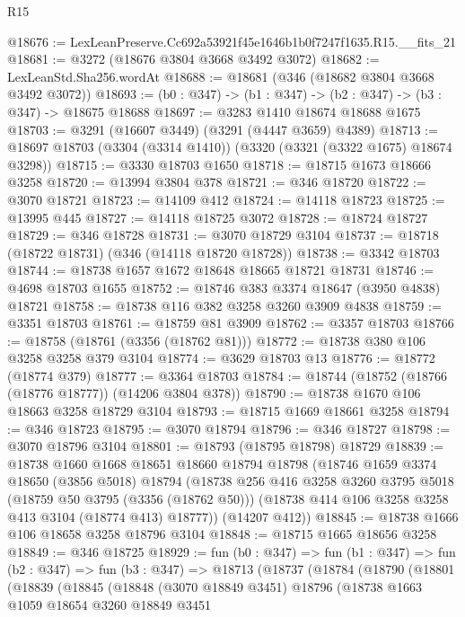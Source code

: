 \begin{lexlean}{R15}
\begin{coremodule}
@18676 := LexLeanPreserve.Cc692a53921f45e1646b1b0f7247f1635.R15.__fits_21
@18681 := @3272 (@18676 @3804 @3668 @3492 @3072)
@18682 := LexLeanStd.Sha256.wordAt
@18688 := @18681 (@346 (@18682 @3804 @3668 @3492 @3072))
@18693 := (b0 : @347) -> (b1 : @347) -> (b2 : @347) -> (b3 : @347) -> @18675 @18688
@18697 := @3283 @1410 @18674 @18688 @1675
@18703 := @3291 (@16607 @3449) (@3291 (@4447 @3659) @4389)
@18713 := @18697 @18703 (@3304 (@3314 @1410)) (@3320 (@3321 (@3322 @1675) @18674 @3298))
@18715 := @3330 @18703 @1650
@18718 := @18715 @1673 @18666 @3258
@18720 := @13994 @3804 @378
@18721 := @346 @18720
@18722 := @3070 @18721
@18723 := @14109 @412
@18724 := @14118 @18723
@18725 := @13995 @445
@18727 := @14118 @18725 @3072
@18728 := @18724 @18727
@18729 := @346 @18728
@18731 := @3070 @18729 @3104
@18737 := @18718 (@18722 @18731) (@346 (@14118 @18720 @18728))
@18738 := @3342 @18703
@18744 := @18738 @1657 @1672 @18648 @18665 @18721 @18731
@18746 := @4698 @18703 @1655
@18752 := @18746 @383 @3374 @18647 (@3950 @4838) @18721
@18758 := @18738 @116 @382 @3258 @3260 @3909 @4838
@18759 := @3351 @18703
@18761 := @18759 @81 @3909
@18762 := @3357 @18703
@18766 := @18758 (@18761 (@3356 (@18762 @81)))
@18772 := @18738 @380 @106 @3258 @3258 @379 @3104
@18774 := @3629 @18703 @13
@18776 := @18772 (@18774 @379)
@18777 := @3364 @18703
@18784 := @18744 (@18752 (@18766 (@18776 @18777)) (@14206 @3804 @378))
@18790 := @18738 @1670 @106 @18663 @3258 @18729 @3104
@18793 := @18715 @1669 @18661 @3258
@18794 := @346 @18723
@18795 := @3070 @18794
@18796 := @346 @18727
@18798 := @3070 @18796 @3104
@18801 := @18793 (@18795 @18798) @18729
@18839 := @18738
    @1660
    @1668
    @18651
    @18660
    @18794
    @18798
    (@18746
      @1659
      @3374
      @18650
      (@3856 @5018)
      @18794
      (@18738
        @256
        @416
        @3258
        @3260
        @3795
        @5018
        (@18759 @50 @3795 (@3356 (@18762 @50)))
        (@18738 @414 @106 @3258 @3258 @413 @3104 (@18774 @413) @18777))
      (@14207 @412))
@18845 := @18738 @1666 @106 @18658 @3258 @18796 @3104
@18848 := @18715 @1665 @18656 @3258
@18849 := @346 @18725
@18929 := fun (b0 : @347) =>
  fun (b1 : @347) =>
  fun (b2 : @347) =>
  fun (b3 : @347) =>
  @18713
    (@18737
      (@18784
        (@18790
          (@18801
            (@18839
              (@18845
                (@18848
                  (@3070 @18849 @3451)
                  @18796
                  (@18738
                    @1663
                    @1059
                    @18654
                    @3260
                    @18849
                    @3451

\end{coremodule}
\end{lexlean}
